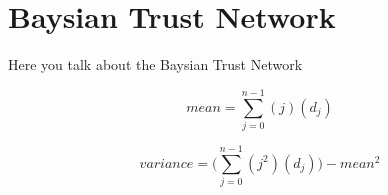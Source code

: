 \section{Baysian Trust Network}
Here you talk about the Baysian Trust Network

\begin{figure}[h]
\begin{equation}
mean = \sum_{j=0}^{n-1}{(j)(d_j)}
\end{equation}
\end{figure}

\begin{figure}[h]
\begin{equation}
variance = \bigg(\sum_{j=0}^{n-1}{(j^2)(d_j)} \bigg) - mean^2
\end{equation}
\end{figure}

